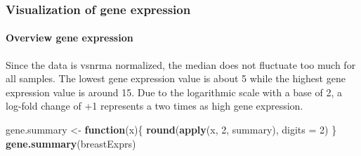 \documentclass[
]{article}
\newenvironment{Shaded}{\begin{snugshade}}{\end{snugshade}}
\newcommand{\ControlFlowTok}[1]{\textcolor[rgb]{0.13,0.29,0.53}{\textbf{#1}}}
\newcommand{\DataTypeTok}[1]{\textcolor[rgb]{0.13,0.29,0.53}{#1}}
\newcommand{\DecValTok}[1]{\textcolor[rgb]{0.00,0.00,0.81}{#1}}
\newcommand{\KeywordTok}[1]{\textcolor[rgb]{0.13,0.29,0.53}{\textbf{#1}}}
\newcommand{\NormalTok}[1]{#1}
\newcommand{\StringTok}[1]{\textcolor[rgb]{0.31,0.60,0.02}{#1}}
\begin{document}
\hypertarget{visualization-of-gene-expression}{%
\subsubsection{Visualization of gene
expression}\label{visualization-of-gene-expression}}

\hypertarget{overview-gene-expression}{%
\paragraph{Overview gene expression}\label{overview-gene-expression}}

Since the data is vsnrma normalized, the median does not fluctuate too
much for all samples. The lowest gene expression value is about 5 while
the highest gene expression value is around 15. Due to the logarithmic
scale with a base of 2, a log-fold change of +1 represents a two times
as high gene expression.

\begin{Shaded}
\begin{Highlighting}[]
\NormalTok{gene.summary <-}\StringTok{ }\ControlFlowTok{function}\NormalTok{(x)\{}
 \KeywordTok{round}\NormalTok{(}\KeywordTok{apply}\NormalTok{(x, }\DecValTok{2}\NormalTok{, summary), }\DataTypeTok{digits =} \DecValTok{2}\NormalTok{)}
\NormalTok{\}}
\KeywordTok{gene.summary}\NormalTok{(breastExprs)}
\end{Highlighting}
\end{Shaded}
\end{document}
